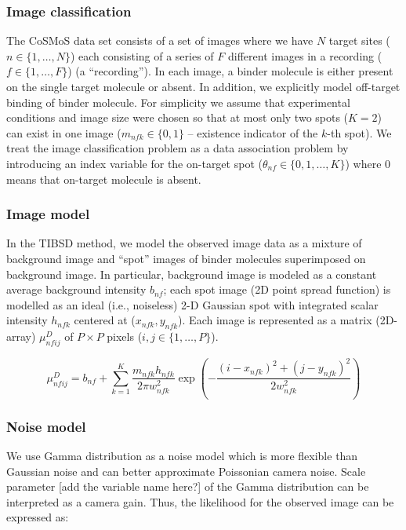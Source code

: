 \subsubsection{Image classification}

The CoSMoS data set consists of a set of images where we have $N$ target sites ($n \in \{1,\dots,N\}$) each consisting of a series of $F$ different images in a recording ($f \in \{1,\dots,F\}$) (a “recording”). In each image, a binder molecule is either present on the single target molecule or absent. In addition, we explicitly model off-target binding of binder molecule. For simplicity  we assume that experimental conditions and image size were chosen so that at most only two spots ($K=2$) can exist in one image ($m_{nfk} \in \{ 0,1 \}$ -- existence indicator of the $k$-th spot). We treat the image classification problem as a data association problem by introducing an index variable for the on-target spot ($\theta_{nf} \in \{ 0,1,\dots,K \}$) where 0 means that on-target molecule is absent.

\subsubsection{Image model}

In the TIBSD method, we model the observed image data as a mixture of background image and “spot” images of binder molecules superimposed on background image. In particular, background image is modeled as a constant average background intensity $b_{nf}$; each spot image (2D point spread function) is modelled as an ideal (i.e., noiseless) 2-D Gaussian spot with integrated scalar intensity $h_{nfk}$ centered at ($x_{nfk}, y_{nfk}$). Each image is represented as a matrix (2D-array) $\mu^D_{nfij}$ of $P \times P$ pixels ($i,j \in \{1,\dots,P\}$). 

\textbf{\begin{equation*}
    \mu^{D}_{nfij} = b_{nf} + \sum_{k=1}^{K} \dfrac{m_{nfk}h_{nfk}}{2 \pi w^2_{nfk}} \exp{\left ( -\dfrac{(i-x_{nfk})^2 + (j-y_{nfk})^2}{2w^2_{nfk}} \right)}
\end{equation*}}

\subsubsection{Noise model}

 We use Gamma distribution as a noise model which is more flexible than Gaussian noise and can better approximate Poissonian camera noise. Scale parameter [add the variable name here?] of the Gamma distribution can be interpreted as a camera gain. Thus, the likelihood for the observed image can be expressed as:
 
